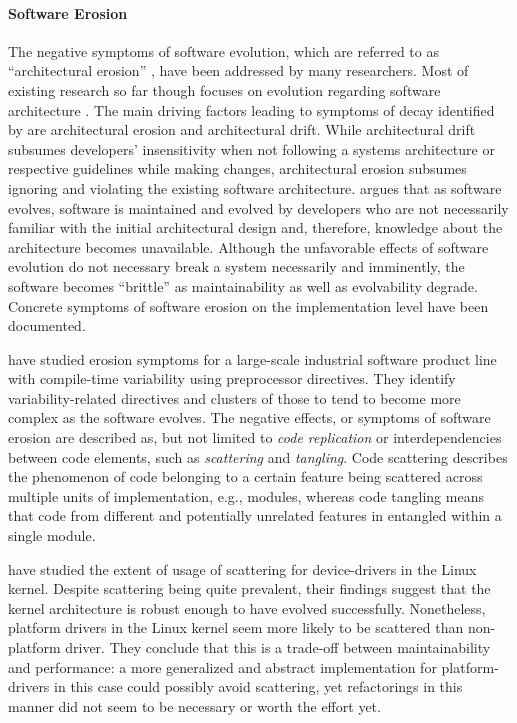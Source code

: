 \paragraph*{Software Erosion}
The negative symptoms of software evolution, which are referred to as
``architectural erosion'' \citep{breivold_systematic_2012}, have
been addressed by many researchers.
Most of existing research so far though focuses on evolution regarding software architecture
\citep{breivold_systematic_2012}. The main driving factors leading to symptoms of decay
identified by \cite{perry_software_1991} are architectural erosion and
architectural drift. While architectural drift subsumes developers'
insensitivity when not following a systems architecture or respective guidelines while making changes, architectural erosion subsumes ignoring and violating the existing software
architecture. \cite{parnas_software_1994} argues that as software evolves, software is maintained
and evolved by developers who are not necessarily familiar with the initial
architectural design and, therefore, knowledge about the architecture becomes
unavailable. Although the unfavorable effects of software evolution do not necessary break a
system necessarily and imminently, the software becomes ``brittle'' \citep{perry_software_1991}
as maintainability as well as evolvability degrade. Concrete  symptoms of software
erosion on the implementation level have been documented. 

\cite{zhang_variability_2013} have studied erosion symptoms for a large-scale
industrial software product line with compile-time variability using
preprocessor directives.
They identify variability-related directives and clusters of those to tend to become more
complex as the software evolves. The negative effects, or symptoms of software
erosion are described as, but not limited to \emph{code replication} or
interdependencies between code elements, such as \emph{scattering} and
\emph{tangling}. Code scattering describes the phenomenon of code belonging to
a certain feature being scattered across multiple units of implementation,
e.g., modules, whereas code tangling means that code from different and
potentially unrelated features in entangled within a single module.

\cite{passos_feature_2015} have studied the extent of usage of scattering for device-drivers
in the Linux kernel. Despite scattering being quite prevalent, their
findings suggest that the kernel architecture is robust enough to have evolved
successfully. Nonetheless, platform drivers in the Linux kernel seem more
likely to be scattered than non-platform driver. They conclude that this is a
trade-off between maintainability and performance: a more generalized and
abstract implementation for platform-drivers in this case could possibly avoid
scattering, yet refactorings in this manner did not seem to be necessary or
worth the effort yet.

